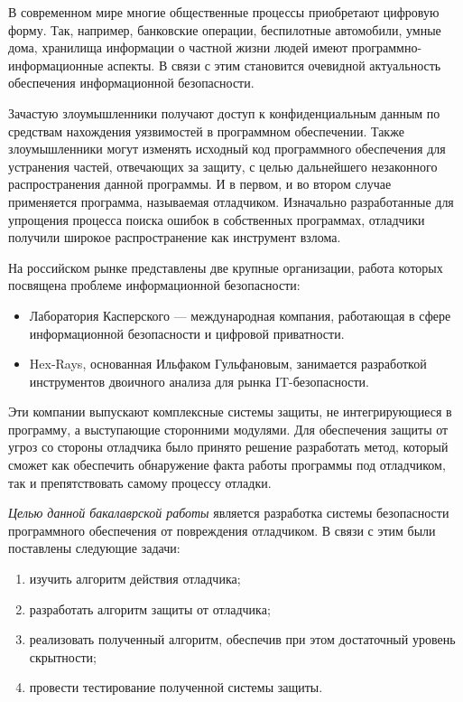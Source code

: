 
В современном мире многие  общественные процессы приобретают цифровую форму.
Так, например, банковские операции, беспилотные автомобили, умные дома,
хранилища информации о частной жизни людей имеют программно-информационные
аспекты. В связи с этим становится очевидной актуальность обеспечения
информационной безопасности. 

Зачастую злоумышленники получают доступ к конфиденциальным данным по средствам
нахождения уязвимостей в программном обеспечении. Также злоумышленники могут
изменять исходный код программного обеспечения для устранения частей, отвечающих
за защиту, с целью дальнейшего незаконного распространения данной программы. И в
первом, и во втором случае применяется программа, называемая отладчиком.
Изначально разработанные для упрощения процесса поиска ошибок в собственных
программах, отладчики получили широкое распространение как инструмент взлома. 

На российском рынке представлены две крупные организации, работа которых
посвящена проблеме информационной безопасности:
\begin{itemize}
  \item Лаборатория Касперского --- международная компания, работающая в сфере
    информационной безопасности и цифровой приватности.
  \item Hex-Rays, основанная Ильфаком Гульфановым, занимается разработкой
    инструментов двоичного анализа для рынка IT-безопасности.
\end{itemize}

Эти компании выпускают комплексные системы защиты, не интегрирующиеся в
программу, а выступающие сторонними модулями. Для обеспечения
защиты от угроз со стороны отладчика было принято решение
разработать метод, который сможет как обеспечить обнаружение факта работы
программы под отладчиком, так и препятствовать самому процессу отладки.


\textit{Целью данной бакалаврской работы} является разработка системы
безопасности программного обеспечения от повреждения отладчиком.  В связи с этим
были поставлены следующие задачи:

\begin{enumerate}
  \item изучить алгоритм действия отладчика;
  \item разработать алгоритм защиты от отладчика;
  \item реализовать полученный алгоритм, обеспечив при этом достаточный
    уровень скрытности;
  \item провести тестирование полученной системы защиты.
\end{enumerate}
